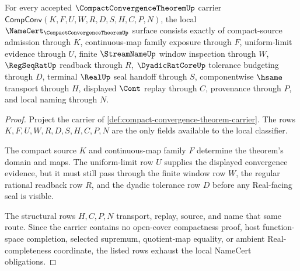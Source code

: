 \begin{theorem}
\label{thm:compact-convergence-theorem-namecert-obligations}
For every accepted $\CompactConvergenceTheoremUp$ carrier $\mathsf{CompConv}(K,F,U,W,R,D,S,H,C,P,N)$, the local $\NameCert_{\CompactConvergenceTheoremUp}$ surface consists exactly of compact-source admission through $K$, continuous-map family exposure through $F$, uniform-limit evidence through $U$, finite $\StreamNameUp$ window inspection through $W$, $\RegSeqRatUp$ readback through $R$, $\DyadicRatCoreUp$ tolerance budgeting through $D$, terminal $\RealUp$ seal handoff through $S$, componentwise $\hsame$ transport through $H$, displayed $\Cont$ replay through $C$, provenance through $P$, and local naming through $N$.
\end{theorem}
\begin{proof}
Project the carrier of \autoref{def:compact-convergence-theorem-carrier}. The rows $K,F,U,W,R,D,S,H,C,P,N$ are the only fields available to the local classifier.

The compact source $K$ and continuous-map family $F$ determine the theorem's domain and maps. The uniform-limit row $U$ supplies the displayed convergence evidence, but it must still pass through the finite window row $W$, the regular rational readback row $R$, and the dyadic tolerance row $D$ before any Real-facing seal is visible.

The structural rows $H,C,P,N$ transport, replay, source, and name that same route. Since the carrier contains no open-cover compactness proof, host function-space completion, selected supremum, quotient-map equality, or ambient Real-completeness coordinate, the listed rows exhaust the local NameCert obligations.
\end{proof}


